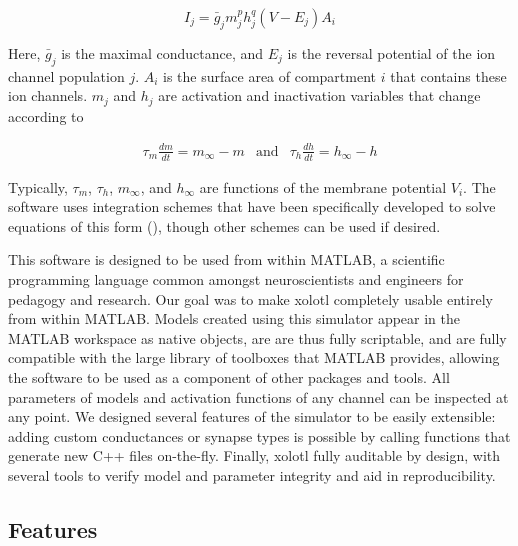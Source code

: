 \documentclass{frontiersSCNS} %
\begin{document}
\begin{equation}
I_{j}=\bar{g}_{j}m_{j}^{p}h_{j}^{q}(V-E_{j})A_{i}  \label{eq:2}
\end{equation}

Here, \( \bar{g}_{j} \) is the maximal conductance, and \( E_{j} \) is the reversal potential of the ion channel population \( j \). \( A_{i} \) is the surface area of compartment \( i\) that contains these ion channels.  \( m_{j} \) and \( h_{j} \) are activation and inactivation variables that change according to

\begin{eqnarray*}
\tau_{m}\frac{dm}{dt}=m_{\infty}-m & \mathrm{and} & \tau_{h}\frac{dh}{dt}=h_{\infty}-h
\end{eqnarray*}

Typically, \( \tau_{m} \), \( \tau_{h} \), \( m_{\infty} \), and \( h_{\infty} \) are functions of the membrane potential \( V_{i} \). The software uses integration schemes that have been specifically developed to solve equations of this form (\cite{dayanTheoreticalNeuroscience2001, hinesEfficientComputationBranched1984, ohErrorAnalysisSpecialized2006}), though other schemes can be used if desired.

This software is designed to be used from within MATLAB, a scientific programming language common amongst neuroscientists and engineers for pedagogy and research. Our goal was to make xolotl completely usable entirely from within MATLAB. Models created using this simulator appear in the MATLAB workspace as native objects, are are thus fully scriptable, and are fully compatible with the large library of toolboxes that MATLAB provides, allowing the software to be used as a component of other packages and tools. All parameters of models and activation functions of any channel can be inspected at any point. We designed several features of the simulator to be easily extensible: adding custom conductances or synapse types is possible by calling functions that generate new C++ files on-the-fly. Finally, xolotl fully auditable by design, with several tools to verify model and parameter integrity and aid in reproducibility.



\subsection{Features}
\label{features}
\end{document}

